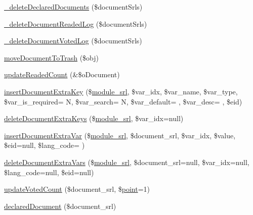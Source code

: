 \begin{DoxyCompactItemize}
\item 
\hyperlink{classdocumentController_a2514acfe313b7ddd5daccb50557d38b5}{\+\_\+delete\+Declared\+Documents} (\$document\+Srls)
\item 
\hyperlink{classdocumentController_ac055fa2cc48de200d0b319eddd7a13da}{\+\_\+delete\+Document\+Readed\+Log} (\$document\+Srls)
\item 
\hyperlink{classdocumentController_a9fe391d1b1ece3b7b16d15976c1622d0}{\+\_\+delete\+Document\+Voted\+Log} (\$document\+Srls)
\item 
\hyperlink{classdocumentController_a3f861f8df6113ca3211c48be3c49f305}{move\+Document\+To\+Trash} (\$obj)
\item 
\hyperlink{classdocumentController_a437461a6588e59e038ed54316bfa7893}{update\+Readed\+Count} (\&\$o\+Document)
\item 
\hyperlink{classdocumentController_a832207dfbf4dac2f32d4a365f9e5ea77}{insert\+Document\+Extra\+Key} (\$\hyperlink{ko_8install_8php_a370bb6450fab1da3e0ed9f484a38b761}{module\+\_\+srl}, \$var\+\_\+idx, \$var\+\_\+name, \$var\+\_\+type, \$var\+\_\+is\+\_\+required= \textquotesingle{}N\textquotesingle{}, \$var\+\_\+search= \textquotesingle{}N\textquotesingle{}, \$var\+\_\+default= \textquotesingle{}\textquotesingle{}, \$var\+\_\+desc= \textquotesingle{}\textquotesingle{}, \$eid)
\item 
\hyperlink{classdocumentController_a279894a3cef824bc940cda67ced511aa}{delete\+Document\+Extra\+Keys} (\$\hyperlink{ko_8install_8php_a370bb6450fab1da3e0ed9f484a38b761}{module\+\_\+srl}, \$var\+\_\+idx=null)
\item 
\hyperlink{classdocumentController_adb5345b43e9795d7e647754cb88b9b5a}{insert\+Document\+Extra\+Var} (\$\hyperlink{ko_8install_8php_a370bb6450fab1da3e0ed9f484a38b761}{module\+\_\+srl}, \$document\+\_\+srl, \$var\+\_\+idx, \$value, \$eid=null, \$lang\+\_\+code= \textquotesingle{}\textquotesingle{})
\item 
\hyperlink{classdocumentController_a1ebb5684cf99ea4044fa476c6d006bd2}{delete\+Document\+Extra\+Vars} (\$\hyperlink{ko_8install_8php_a370bb6450fab1da3e0ed9f484a38b761}{module\+\_\+srl}, \$document\+\_\+srl=null, \$var\+\_\+idx=null, \$lang\+\_\+code=null, \$eid=null)
\item 
\hyperlink{classdocumentController_aca82ae9abe825d3ee6182d3608e71e31}{update\+Voted\+Count} (\$document\+\_\+srl, \$\hyperlink{classpoint}{point}=1)
\item 
\hyperlink{classdocumentController_aa2cdd129c5f882d535e39728761d4168}{declared\+Document} (\$document\+\_\+srl)

\end{DoxyCompactItemize}
